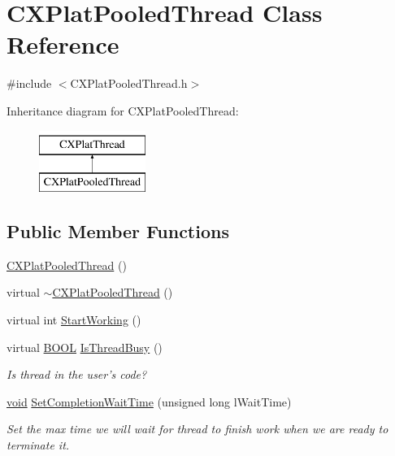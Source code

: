 \hypertarget{class_c_x_plat_pooled_thread}{\section{\-C\-X\-Plat\-Pooled\-Thread \-Class \-Reference}
\label{class_c_x_plat_pooled_thread}
}


{\ttfamily \#include $<$\-C\-X\-Plat\-Pooled\-Thread.\-h$>$}

\-Inheritance diagram for \-C\-X\-Plat\-Pooled\-Thread\-:\begin{figure}[H]
\begin{center}
\leavevmode
\includegraphics[height=2.000000cm]{class_c_x_plat_pooled_thread}
\end{center}
\end{figure}
\subsection*{\-Public \-Member \-Functions}
\begin{DoxyCompactItemize}
\item 
\hyperlink{class_c_x_plat_pooled_thread_ae83c999db18cc5efc0b1d7adfc3dc421}{\-C\-X\-Plat\-Pooled\-Thread} ()
\item 
virtual \hyperlink{class_c_x_plat_pooled_thread_ad5c141f6171340a1b5c3ea4c2b71dfde}{$\sim$\-C\-X\-Plat\-Pooled\-Thread} ()
\item 
virtual int \hyperlink{class_c_x_plat_pooled_thread_abe885544566fee0b5a07512c3202d120}{\-Start\-Working} ()
\item 
virtual \hyperlink{_cpclient_8h_a3be13892ae7076009afcf121347dd319}{\-B\-O\-O\-L} \hyperlink{class_c_x_plat_pooled_thread_a2024d59a6361c65af533f4b12501e6f3}{\-Is\-Thread\-Busy} ()
\begin{DoxyCompactList}\small\item\em \-Is thread in the user's code? \end{DoxyCompactList}\item 
\hyperlink{_cpclient_8h_a6464f7480a0fd0ee170cba12b2c0497f}{void} \hyperlink{class_c_x_plat_pooled_thread_a88375206dfba56aaef406774df8f23d1}{\-Set\-Completion\-Wait\-Time} (unsigned long l\-Wait\-Time)
\begin{DoxyCompactList}\small\item\em \-Set the max time we will wait for thread to finish work when we are ready to terminate it. \end{DoxyCompactList}\end{DoxyCompactItemize}
